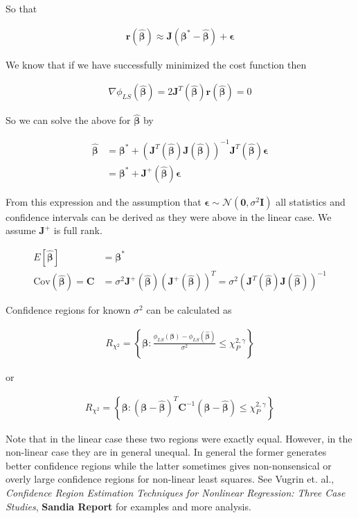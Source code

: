 \documentclass[12pt]{article}
\newcommand{\ep}{\epsilon}
\newcommand{\bv}[1]{\boldsymbol{#1}}
\begin{document}
So that

\begin{align}
\bv{r}(\bv{\hat{\beta}}) \approx \bv{J}(\bv{\beta^*} - \bv{\hat{\beta}}) + \bv{\ep}
\end{align}

We know that if we have successfully minimized the cost function then 

\begin{align}
\nabla \phi_{LS}(\bv{\hat{\beta}}) = 2\bv{J}^T(\bv{\hat{\beta}})\bv{r}(\bv{\hat{\beta}}) = 0
\end{align}

So we can solve the above for $\bv{\hat{\beta}}$ by

\begin{align}
\bv{\hat{\beta}} &= \bv{\beta^*} + (\bv{J}^T(\bv{\hat{\beta}})\bv{J}(\bv{\hat{\beta}}))^{-1}\bv{J}^T(\bv{\hat{\beta}})\bv{\ep}\\
&= \bv{\beta^*} + \bv{J}^+(\bv{\hat{\beta}})\bv{\ep}
\end{align}

From this expression and the assumption that $\bv{\ep} \sim \mathcal{N}(\bv{0}, \sigma^2\bv{I})$ all statistics and confidence intervals can be derived as they were above in the linear case. We assume $\bv{J}^+$ is full rank.

\begin{align}
E\left[\bv{\hat{\beta}}\right] &= \bv{\beta^*}\\
\text{Cov}(\bv{\hat{\beta}}) = \bv{C} &= \sigma^2\bv{J}^+(\bv{\hat{\beta}})(\bv{J}^+(\bv{\hat{\beta}}))^T = \sigma^2\left(\bv{J}^T(\bv{\hat{\beta}})\bv{J}(\bv{\hat{\beta}})\right)^{-1}
\end{align}

Confidence regions for known $\sigma^2$ can be calculated as

\begin{align}
R_{\chi^2} = \left\{\bv{\beta} : \frac{\phi_{LS}(\bv{\beta}) - \phi_{LS}(\bv{\hat{\beta}})}{\sigma^2} \le \chi^{2,\gamma}_P \right\}
\end{align}

or

\begin{align}
R_{\chi^2} = \left\{\bv{\beta}: \left(\bv{\beta}-\bv{\hat{\beta}}\right)^T\bv{C}^{-1}\left(\bv{\beta} - \bv{\hat{\beta}}\right) \le \chi^{2,\gamma}_P\right\}
\end{align}

Note that in the linear case these two regions were exactly equal. However, in the non-linear case they are in general unequal. 
In general the former generates better confidence regions while the latter sometimes gives non-nonsensical or overly large confidence regions for non-linear least squares.
See Vugrin et. al., \textit{Confidence Region Estimation Techniques for Nonlinear Regression: Three Case Studies}, \textbf{Sandia Report} for examples and more analysis.
\end{document}
